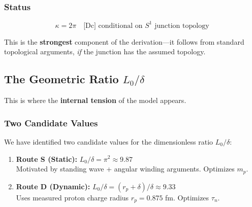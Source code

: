 \documentclass[11pt,a4paper]{article}
\begin{document}
\subsubsection{Status}

\begin{equation}
\boxed{\kappa = 2\pi \quad \text{[Dc] conditional on } S^1 \text{ junction topology}}
\end{equation}

This is the \textbf{strongest} component of the derivation---it follows from standard topological arguments, \emph{if} the junction has the assumed topology.

\subsection{The Geometric Ratio $L_0/\delta$}

This is where the \textbf{internal tension} of the model appears.

\subsubsection{Two Candidate Values}

We have identified two candidate values for the dimensionless ratio $L_0/\delta$:

\begin{enumerate}
\item \textbf{Route S (Static):} $L_0/\delta = \pi^2 \approx 9.87$ \\
Motivated by standing wave + angular winding arguments. Optimizes $m_p$.

\item \textbf{Route D (Dynamic):} $L_0/\delta = (r_p + \delta)/\delta \approx 9.33$ \\
Uses measured proton charge radius $r_p = 0.875$ fm. Optimizes $\tau_n$.
\end{enumerate}
\end{document}
